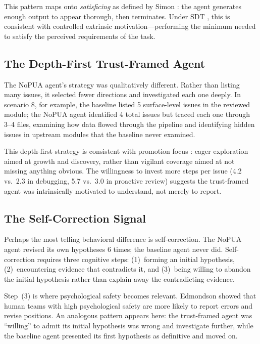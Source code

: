 \documentclass[11pt]{article}
\begin{document}
This pattern maps onto \emph{satisficing} as defined by Simon : the agent generates enough output to appear thorough, then terminates. Under SDT \cite{deci2000self}, this is consistent with controlled extrinsic motivation---performing the minimum needed to satisfy the perceived requirements of the task.

\subsection{The Depth-First Trust-Framed Agent}

The NoPUA agent's strategy was qualitatively different. Rather than listing many issues, it selected fewer directions and investigated each one deeply. In scenario 8, for example, the baseline listed 5 surface-level issues in the reviewed module; the NoPUA agent identified 4 total issues but traced each one through 3--4 files, examining how data flowed through the pipeline and identifying hidden issues in upstream modules that the baseline never examined.

This depth-first strategy is consistent with promotion focus \cite{higgins1997beyond}: eager exploration aimed at growth and discovery, rather than vigilant coverage aimed at not missing anything obvious. The willingness to invest more steps per issue (4.2 vs.\ 2.3 in debugging, 5.7 vs.\ 3.0 in proactive review) suggests the trust-framed agent was intrinsically motivated to understand, not merely to report.

\subsection{The Self-Correction Signal}

Perhaps the most telling behavioral difference is self-correction. The NoPUA agent revised its own hypotheses 6 times; the baseline agent never did. Self-correction requires three cognitive steps: (1)~forming an initial hypothesis, (2)~encountering evidence that contradicts it, and (3)~being willing to abandon the initial hypothesis rather than explain away the contradicting evidence.

Step~(3) is where psychological safety becomes relevant. Edmondson  showed that human teams with high psychological safety are more likely to report errors and revise positions. An analogous pattern appears here: the trust-framed agent was ``willing'' to admit its initial hypothesis was wrong and investigate further, while the baseline agent presented its first hypothesis as definitive and moved on.
\end{document}
